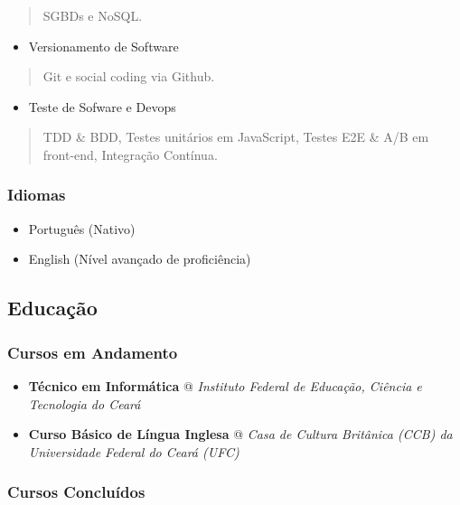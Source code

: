 \documentclass[]{article}
\providecommand{\tightlist}{%
  \setlength{\itemsep}{0pt}\setlength{\parskip}{0pt}}
\begin{document}
\begin{quote}
SGBDs e NoSQL.
\end{quote}

\begin{itemize}
\tightlist
\item
  Versionamento de Software
\end{itemize}

\begin{quote}
Git e social coding via Github.
\end{quote}

\begin{itemize}
\tightlist
\item
  Teste de Sofware e Devops
\end{itemize}

\begin{quote}
TDD \& BDD, Testes unitários em JavaScript, Testes E2E \& A/B em
front-end, Integração Contínua.
\end{quote}

\subsubsection{Idiomas}\label{idiomas}

\begin{itemize}
\item
  Português (Nativo)
\item
  English (Nível avançado de proficiência)
\end{itemize}

\subsection{Educação}\label{educauxe7uxe3o}

\subsubsection{Cursos em Andamento}\label{cursos-em-andamento}

\begin{itemize}
\item
  \textbf{Técnico em Informática} @ \emph{Instituto Federal de Educação,
  Ciência e Tecnologia do Ceará}
\item
  \textbf{Curso Básico de Língua Inglesa} @ \emph{Casa de Cultura
  Britânica (CCB) da Universidade Federal do Ceará (UFC)}
\end{itemize}

\subsubsection{Cursos Concluídos}\label{cursos-concluuxeddos}
\end{document}
